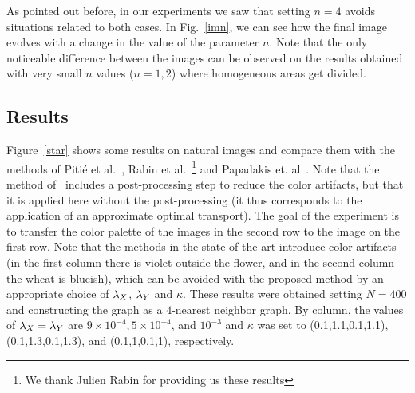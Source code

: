 As pointed out before, in our experiments we saw that setting $n=4$ avoids situations related to both cases. In Fig.~\ref{imn}, we can see how the final image evolves with a change in the value of the parameter $n$. Note that the only noticeable difference between the images can be observed on the results obtained with very small $n$ values ($n=1,2$) where homogeneous areas get divided. %





\subsection{Results}


Figure~\ref{star} shows some results on natural images and compare them with the methods of Piti\'e et al.~\cite{Pitie07}, Rabin et al.~\cite{Rabin_ip11}\footnote{We thank Julien Rabin for providing us these results} and Papadakis et. al~\cite{Papadakis_ip11}. Note that the method of~\cite{Pitie07} includes a post-processing step to reduce the color artifacts, but that it is applied here without the post-processing (it thus corresponds to the application of an approximate optimal transport).
 The goal of the experiment is to transfer the color palette of the images in the second row to the image on the first row.  Note that the methods in the state of the art introduce color artifacts (in the first column there is violet outside the flower, and in the second column the wheat is blueish), which can be avoided with the proposed method by an appropriate choice of $\lambda_X$, $\lambda_Y$ and $\kappa$. These results were obtained setting $N=400$ and constructing the graph as a $4$-nearest neighbor graph. By column, the values of $\lambda_X=\lambda_Y$ are $9\times 10^{-4}, 5\times 10^{-4}$, and $10^{-3}$ and $\kappa$ was set to (0.1,1.1,0.1,1.1), (0.1,1.3,0.1,1.3), and (0.1,1,0.1,1), respectively.
 

\newlength{\mylen} %

\newcommand{\sidecap}[1]{{\begin{sideways}\parbox{3.3cm}{\centering #1}\end{sideways}} \hspace{-4mm}}

\newcommand{\myimg}[1]{\texttt{[image: \#1]}}


